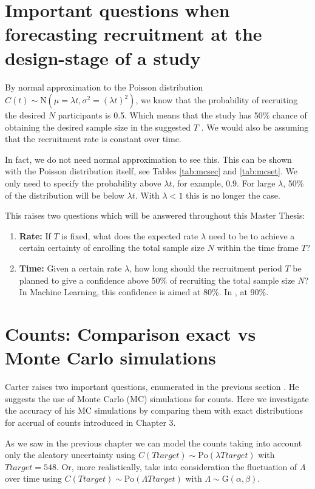 \section{Important questions when forecasting recruitment at the design-stage of a study}

By normal approximation to the Poisson distribution $C(t)\sim \textrm{N}(\mu=\lambda t, \sigma^2=(\lambda t)^2)$, we know that the probability of recruiting the desired $N$ participants is 0.5. Which means that the study has 50\% chance of obtaining the desired sample size in the suggested $T$ \citep{carter2004application}. We would also be assuming that the recruitment rate is constant over time.

In fact, we do not need normal approximation to see this. This can be shown with the Poisson distribution itself, see Tables \ref{tab:mcsec} and \ref{tab:mcset}. We only need to specify the probability above $\lambda t$, for example, $0.9$. For large $\lambda$, 50\% of the distribution will be below $\lambda t$. With $\lambda < 1$ this is no longer the case. 

This raises two questions which will be answered throughout this Master Thesis:
\begin{enumerate}
\item \textbf{Rate:} If $T$ is fixed, what does the expected rate $\lambda$ need to be to achieve a certain certainty of enrolling the total sample size $N$ within the time frame $T$?
\item \textbf{Time:} Given a certain rate $\lambda$, how long should the recruitment period $T$ be planned to give a confidence above 50\% of recruiting the total sample size $N$? In Machine Learning, this confidence is aimed at 80\%. In \cite{carter2004application}, at 90\%.
\end{enumerate}


\section{Counts: Comparison exact vs Monte Carlo simulations}

Carter raises two important questions, enumerated in the previous section \citep{carter2004application, carter2005practical}. He suggests the use of Monte Carlo (MC) simulations for counts. Here we investigate the accuracy of his MC simulations by comparing them with exact distributions for accrual of counts introduced in Chapter 3.

As we saw in the previous chapter we can model the counts taking into account only the aleatory uncertainty using $C(Ttarget)\sim \textrm{Po}(\lambda Ttarget)$ with $Ttarget=548$. Or, more realistically, take into consideration the fluctuation of $\Lambda$ over time using $C(Ttarget)\sim \textrm{Po}(\Lambda Ttarget)$ with $\Lambda\sim \textrm{G}(\alpha, \beta)$.


